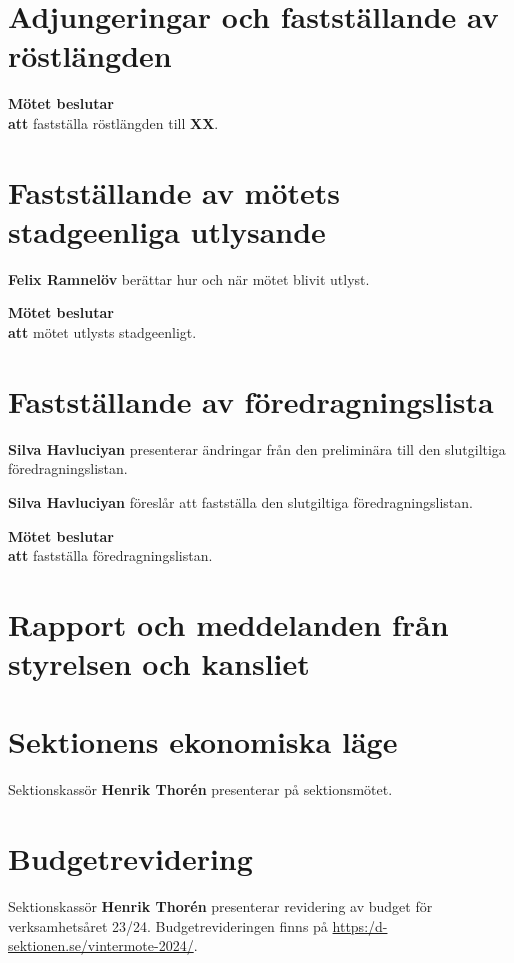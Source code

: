 \documentclass{datateknologsektionen-document}
\newcommand{\ind}{\hspace*{2em}}
\newcommand{\motetbeslutar}{\textbf{Mötet beslutar}}
\newcommand{\att}{\\\ind\textbf{att}}
\begin{document}
\section{Adjungeringar och fastställande av röstlängden}



\motetbeslutar
\att{} fastställa röstlängden till \textbf{XX}.



\section{Fastställande av mötets stadgeenliga utlysande}
\textbf{Felix Ramnelöv} berättar hur och när mötet blivit utlyst.

\motetbeslutar
\att{} mötet utlysts stadgeenligt.



\pagebreak
\section{Fastställande av föredragningslista}
\textbf{Silva Havluciyan} presenterar ändringar från den preliminära till den slutgiltiga föredragningslistan.

\textbf{Silva Havluciyan} föreslår att fastställa den slutgiltiga föredragningslistan.

\motetbeslutar\att{} fastställa föredragningslistan.


\section{Rapport och meddelanden från styrelsen och kansliet}




\pagebreak
\section{Sektionens ekonomiska läge}
Sektionskassör \textbf{Henrik Thorén} presenterar på sektionsmötet.

\section{Budgetrevidering}
Sektionskassör \textbf{Henrik Thorén} presenterar revidering av budget för verksamhetsåret 23/24. Budgetrevideringen finns på \url{https:/d-sektionen.se/vintermote-2024/}.
\end{document}

